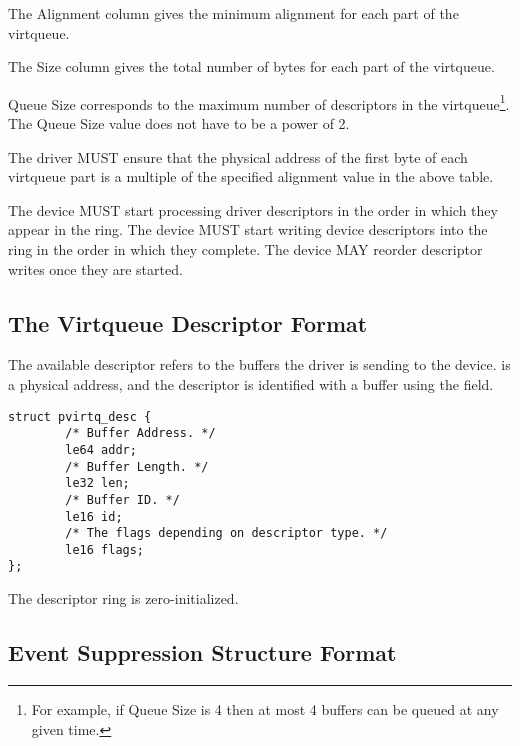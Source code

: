 The Alignment column gives the minimum alignment for each part
of the virtqueue.

The Size column gives the total number of bytes for each
part of the virtqueue.

Queue Size corresponds to the maximum number of descriptors in the
virtqueue\footnote{For example, if Queue Size is 4 then at most 4 buffers
can be queued at any given time.}.  The Queue Size value does not
have to be a power of 2.

The driver MUST ensure that the physical address of the first byte
of each virtqueue part is a multiple of the specified alignment value
in the above table.

The device MUST start processing driver descriptors in the order
in which they appear in the ring.
The device MUST start writing device descriptors into the ring in
the order in which they complete.
The device MAY reorder descriptor writes once they are started.

\subsection{The Virtqueue Descriptor Format}\label{sec:Basic
Facilities of a Virtio Device / Packed Virtqueues / The Virtqueue
Descriptor Format}

The available descriptor refers to the buffers the driver is sending
to the device.  is a physical address, and the
descriptor is identified with a buffer using the  field.

\begin{lstlisting}
struct pvirtq_desc {
        /* Buffer Address. */
        le64 addr;
        /* Buffer Length. */
        le32 len;
        /* Buffer ID. */
        le16 id;
        /* The flags depending on descriptor type. */
        le16 flags;
};
\end{lstlisting}

The descriptor ring is zero-initialized.

\subsection{Event Suppression Structure Format}\label{sec:Basic
Facilities of a Virtio Device / Packed Virtqueues / Event Suppression Structure
Format}

